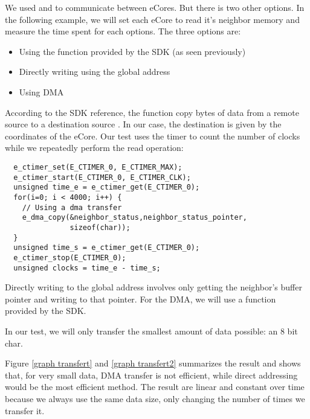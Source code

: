 We used  and  to communicate between \glspl{eCore}. But there is two other options. In the following example, we will set each eCore to read it's neighbor memory and measure the time spent for each options. The three options are:
\begin{itemize}
  \item Using the function  provided by the \gls{SDK} (as seen previously)
  \item Directly writing using the global address
  \item Using \gls{DMA}
\end{itemize}

According to the SDK reference, the function  copy bytes of data from a remote source to a destination source \cite{epiphanySDK}. In our case, the destination is given by the coordinates of the \gls{eCore}. Our test uses the timer to count the number of clocks while we repeatedly perform the read operation:

\begin{lstlisting}
  e_ctimer_set(E_CTIMER_0, E_CTIMER_MAX);
  e_ctimer_start(E_CTIMER_0, E_CTIMER_CLK);
  unsigned time_e = e_ctimer_get(E_CTIMER_0);
  for(i=0; i < 4000; i++) {
    // Using a dma transfer
    e_dma_copy(&neighbor_status,neighbor_status_pointer,
               sizeof(char));
  }
  unsigned time_s = e_ctimer_get(E_CTIMER_0);
  e_ctimer_stop(E_CTIMER_0);
  unsigned clocks = time_e - time_s;
\end{lstlisting}

Directly writing to the global address involves only getting the neighbor's buffer pointer and writing to that pointer. For the \gls{DMA}, we will use a function provided by the \gls{SDK}.

In our test, we will only transfer the smallest amount of data possible: an 8 bit char.

Figure \ref{graph transfert} and \ref{graph transfert2} summarizes the result and shows that, for very small data, \gls{DMA} transfer is not efficient, while direct addressing would be the most efficient method. The result are linear and constant over time because we always use the same data size, only changing the number of times we transfer it.

